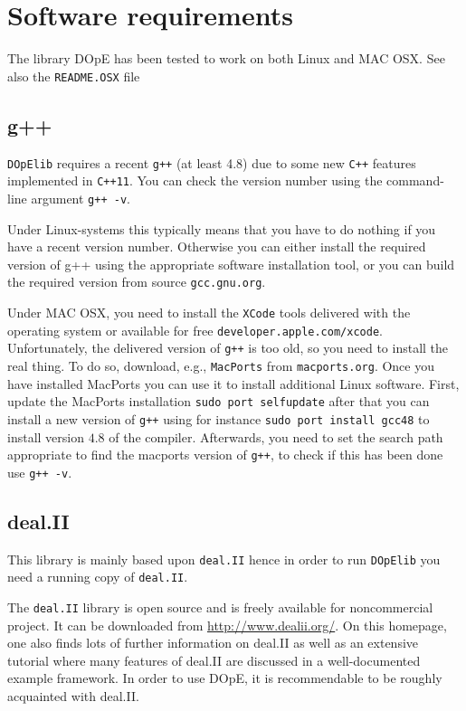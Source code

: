 \section{Software requirements}
The library DOpE has been tested to work on both Linux and 
MAC OSX. See also the \texttt{README.OSX} file 

\subsection{g++}
\texttt{DOpElib} requires a recent \texttt{g++} (at least 4.8) due to 
some new \texttt{C++} features implemented in \texttt{C++11}. 
You can check the version number using the command-line argument \texttt{g++ -v}.

Under Linux-systems this typically means that you have to do nothing if you have a recent 
version number. Otherwise you can either install the required version of g++ using the 
appropriate software installation tool, or you can build the required version from 
source \texttt{gcc.gnu.org}.

Under MAC OSX, you need to install the \texttt{XCode} tools delivered with the operating system 
or available for free \texttt{developer.apple.com/xcode}. Unfortunately, the delivered 
version of \texttt{g++} is too old, so you need to install the real thing. To do so, 
download, e.g., \texttt{MacPorts} from \texttt{macports.org}. Once you have installed MacPorts 
you can use it to install additional Linux software. 
First, update the MacPorts installation \texttt{sudo port selfupdate}
after that you can install a new version of \texttt{g++} using for instance 
\texttt{sudo port install gcc48} to install version $4.8$ of the compiler.
Afterwards, you need to set the search path appropriate to find the macports version
of \texttt{g++}, to check if this has been done use \texttt{g++ -v}.

\subsection{deal.II}
This library is mainly based upon \texttt{deal.II} hence in order to run 
\texttt{DOpElib} you need a running copy of \texttt{deal.II}.

The \texttt{deal.II} library is open source and is freely available for noncommercial project.
It can be downloaded from \url{http://www.dealii.org/}. On this
homepage, one also finds lots of further information on deal.II as well as
an extensive tutorial where many features of deal.II are discussed in a
well-documented example framework. In order to use DOpE, it is
recommendable to be roughly acquainted with deal.II.

